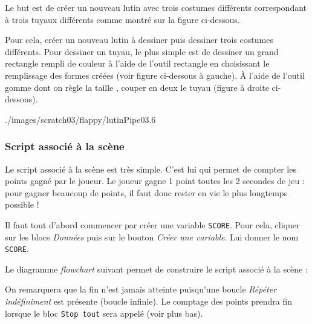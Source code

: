 \vspace{6pt}

Le but est de créer un nouveau lutin avec trois costumes différents correspondant à trois tuyaux différents comme montré sur la figure ci-dessous.



Pour cela, créer un nouveau lutin à dessiner puis dessiner trois costumes différents. Pour dessiner un tuyau, le plus simple est de dessiner un grand rectangle rempli de couleur à l'aide de l'outil rectangle  en choisissant le remplissage des formes créées  (voir figure ci-dessous à gauche). À l'aide de l'outil gomme  dont on règle la taille , couper en deux le tuyau (figure à droite ci-dessous).  

%
	      {./images/scratch03/flappy/lutinPipe03}{.6\textwidth}

 





\subsubsection{Script associé à la scène}

Le script associé à la scène est très simple. C'est lui qui permet de compter les points gagné par le joueur. Le joueur gagne 1 point toutes les 2 secondes de jeu : pour gagner beaucoup de points, il faut donc rester en vie le plus longtemps possible !

\vspace{6pt}

Il faut tout d'abord commencer par créer une variable \texttt{SCORE}. Pour cela, cliquer sur les blocs \emph{Données} puis sur le bouton \emph{Créer une variable}. Lui donner le nom \texttt{SCORE}.

Le diagramme \emph{flowchart} suivant permet de construire le script associé à la scène :



On remarquera que la fin n'est jamais atteinte puisqu'une boucle \emph{Répéter indéfiniment} est présente (boucle infinie). Le comptage des points prendra fin lorsque le bloc \texttt{Stop tout} sera appelé (voir plus bas).





